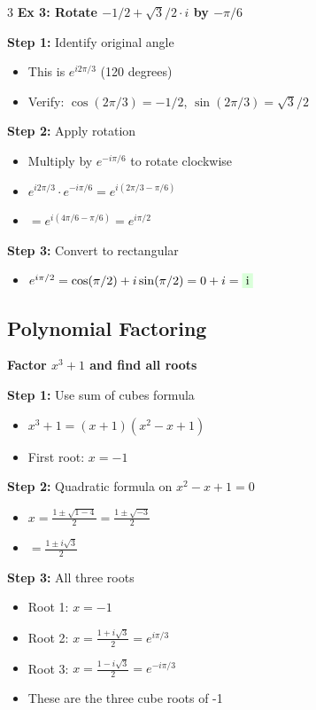 \documentclass[10pt,landscape,a4paper]{article}
\newcommand{\problem}[1]{\textbf{\colorbox{cyan!15}{#1}}}
\newcommand{\answer}[1]{\colorbox{green!15}{#1}}
\begin{document}
\begin{multicols}{3}
\problem{Ex 3: Rotate $-1/2+\sqrt{3}/2\cdot i$ by $-\pi/6$}

\textbf{Step 1:} Identify original angle
\begin{itemize}
\item This is $e^{i2\pi/3}$ (120 degrees)
\item Verify: $\cos(2\pi/3) = -1/2$, $\sin(2\pi/3) = \sqrt{3}/2$
\end{itemize}

\textbf{Step 2:} Apply rotation
\begin{itemize}
\item Multiply by $e^{-i\pi/6}$ to rotate clockwise
\item $e^{i2\pi/3} \cdot e^{-i\pi/6} = e^{i(2\pi/3 - \pi/6)}$
\item $= e^{i(4\pi/6 - \pi/6)} = e^{i\pi/2}$
\end{itemize}

\textbf{Step 3:} Convert to rectangular
\begin{itemize}
\item $e^{i\pi/2} = \cos(\pi/2) + i\sin(\pi/2) = 0 + i = \answer{i}$
\end{itemize}

\subsection*{Polynomial Factoring}

\problem{Factor $x^3 + 1$ and find all roots}

\textbf{Step 1:} Use sum of cubes formula
\begin{itemize}
\item $x^3 + 1 = (x+1)(x^2-x+1)$
\item First root: $x = -1$
\end{itemize}

\textbf{Step 2:} Quadratic formula on $x^2 - x + 1 = 0$
\begin{itemize}
\item $x = \frac{1 \pm \sqrt{1-4}}{2} = \frac{1 \pm \sqrt{-3}}{2}$
\item $= \frac{1 \pm i\sqrt{3}}{2}$
\end{itemize}

\textbf{Step 3:} All three roots
\begin{itemize}
\item Root 1: $x = -1$
\item Root 2: $x = \frac{1 + i\sqrt{3}}{2} = e^{i\pi/3}$
\item Root 3: $x = \frac{1 - i\sqrt{3}}{2} = e^{-i\pi/3}$
\item These are the three cube roots of -1
\end{itemize}


\end{multicols}
\end{document}
